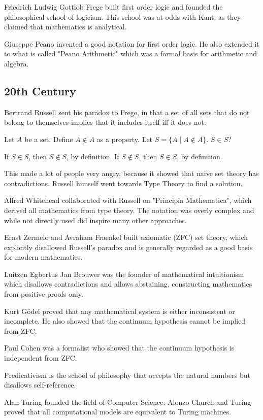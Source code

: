 \documentclass{idc_msc}
\begin{document}
Friedrich Ludwig Gottlob Frege built first order logic and founded the philosophical school of logicism.
This school was at odds with Kant, as they claimed that mathematics is analytical.

Giuseppe Peano invented a good notation for first order logic.
He also extended it to what is called "Peano Arithmetic" which was a formal basis for arithmetic and algebra.


\subsection{20th Century}

Bertrand Russell sent his paradox to Frege, in that a set of all sets that do not belong to themselves implies that it includes itself iff it does not:

Let \(A\) be a set.
Define \(A \notin A\) as a property.
Let \(S=\{A \mid A \notin A\}\).
\(S \in S\)?

If \(S \in S\), then \(S \notin S\), by definition.
If \(S \notin S\), then \(S \in S\), by definition.

This made a lot of people very angry, because it showed that naive set theory has contradictions.
Russell himself went towards Type Theory to find a solution.

Alfred Whitehead collaborated with Russell on "Principia Mathematica", which derived all mathematics from type theory.
The notation was overly complex and while not directly used did inspire many other approaches.

Ernst Zermelo and Avraham Fraenkel built axiomatic (ZFC) set theory, which explicitly disallowed Russell's paradox and is generally regarded as a good basis for modern mathematics.

Luitzen Egbertus Jan Brouwer was the founder of mathematical intuitionism which disallows contradictions and allows abstaining, constructing mathematics from positive proofs only.

Kurt G\"odel proved that any mathematical system is either inconsistent or incomplete.
He also showed that the continuum hypothesis cannot be implied from ZFC.

Paul Cohen was a formalist who showed\cite{cohen1963independence} that the continuum hypothesis is independent from ZFC.

Predicativism is the school of philosophy that accepts the natural numbers but disallows self-reference.

Alan Turing founded the field of Computer Science.
Alonzo Church and Turing proved that all computational models are equivalent to Turing machines.
\end{document}
